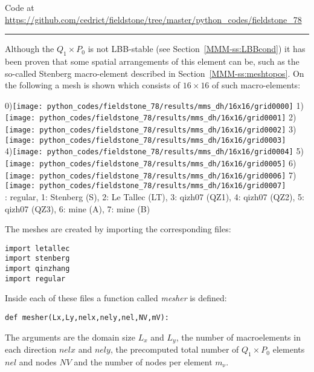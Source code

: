 %

\begin{center}
Code at \url{https://github.com/cedrict/fieldstone/tree/master/python_codes/fieldstone_78}
\end{center}

\par\noindent\rule{\textwidth}{0.4pt}



Although the $Q_1\times P_0$ is not LBB-stable (see Section~\ref{MMM-ss:LBBcond})
it has been proven that some spatial arrangements of this element can be, such as the
so-called Stenberg macro-element described in Section~\ref{MMM-ss:meshtopos}.
On the following a mesh is shown which consists of $16\times 16$ of such macro-elements:

\begin{center}
0)\texttt{[image: python\_codes/fieldstone\_78/results/mms\_dh/16x16/grid0000]}
1)\texttt{[image: python\_codes/fieldstone\_78/results/mms\_dh/16x16/grid0001]}
2)\texttt{[image: python\_codes/fieldstone\_78/results/mms\_dh/16x16/grid0002]}
3)\texttt{[image: python\_codes/fieldstone\_78/results/mms\_dh/16x16/grid0003]}\\
4)\texttt{[image: python\_codes/fieldstone\_78/results/mms\_dh/16x16/grid0004]}
5)\texttt{[image: python\_codes/fieldstone\_78/results/mms\_dh/16x16/grid0005]}
6)\texttt{[image: python\_codes/fieldstone\_78/results/mms\_dh/16x16/grid0006]}
7)\texttt{[image: python\_codes/fieldstone\_78/results/mms\_dh/16x16/grid0007]}\\
{: regular, 
1: Stenberg (S),
2: Le Tallec (LT),
3: qizh07 (QZ1),
4: qizh07 (QZ2),
5: qizh07 (QZ3),
6: mine (A),
7: mine (B)}
\end{center}

The meshes are created by importing the corresponding files:
\begin{lstlisting} 
import letallec
import stenberg
import qinzhang
import regular
\end{lstlisting} 
Inside each of these files a function called {\sl mesher} is defined: 
\begin{lstlisting} 
def mesher(Lx,Ly,nelx,nely,nel,NV,mV):
\end{lstlisting} 
The arguments are the domain size $L_x$ and $L_y$, the number of macroelements
in each direction $nelx$ and $nely$, the precomputed total number of $Q_1\times P_0$ 
elements $nel$ and nodes $NV$ and the number of nodes per element $m_\upnu$.  

